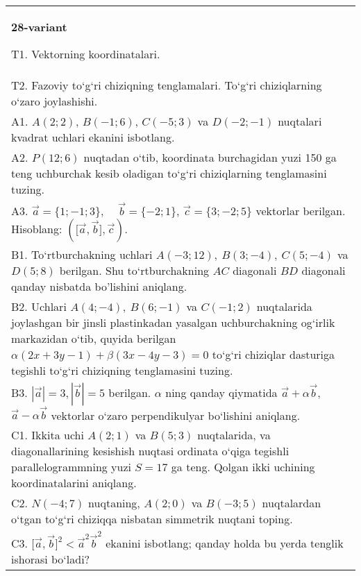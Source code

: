 \documentclass{article}
\begin{document}
\begin{tabular}{m{17cm}}
\textbf{28-variant}
\newline

T1. 
Vektorning koordinatalari.
 \\
T2. 
Fazoviy to‘g‘ri chiziqning tenglamalari. To‘g‘ri chiziqlarning o‘zaro joylashishi.
 \\
A1. 
$A (2;2) $, $B (-1;6) $, $C (-5;3) $ va $D (-2;-1) $
nuqtalari kvadrat uchlari ekanini isbotlang.
 \\
A2. 
$P (12;6)$ nuqtadan o‘tib, koordinata burchagidan
yuzi 150 ga teng uchburchak kesib oladigan to‘g‘ri chiziqlarning
tenglamasini tuzing.
 \\
A3. 
$\overrightarrow{a}
= \{ 1; - 1;3\}, \ \ \ \ \ \overrightarrow{b} = \{ - 2;1\}$, $\overrightarrow{c} = \{3; -2;5\}$ vektorlar berilgan. Hisoblang:
$ (\lbrack\overrightarrow{a},\overrightarrow{b}\rbrack,\overrightarrow{c}) $.
 \\
B1. 
To‘rtburchakning uchlari
\(A (-3;12),\ B (3;-4),\ C (5;-4) \) va \(D (5;8) \) berilgan. Shu
to‘rtburchakning $AC$ diagonali $BD$ diagonali qanday
nisbatda bo'lishini aniqlang.
 \\
B2. 
Uchlari \(A (4;-4),\ B (6;-1) \) va \(C (-1;2) \)
nuqtalarida joylashgan bir jinsli plastinkadan yasalgan uchburchakning
og‘irlik markazidan o‘tib, quyida berilgan
\(\alpha (2x+3y-1) +\beta (3x-4y-3) =0\) to‘g‘ri chiziqlar dasturiga
tegishli to‘g‘ri chiziqning tenglamasini tuzing. \\
B3. 
$|\vec{a}| = 3,|\vec{b}| = 5$ berilgan. $\alpha$ ning qanday qiymatida $\vec{a} + \alpha\vec{b}$, $\vec{a} - \alpha\vec{b}$ vektorlar o‘zaro perpendikulyar bo‘lishini aniqlang.
 \\
C1. 
Ikkita uchi \(A (2;1) \) va \(B (5; 3) \) nuqtalarida, va
diagonallarining kesishish nuqtasi ordinata o‘qiga tegishli
parallelogrammning yuzi \(S = 17\) ga teng. Qolgan ikki uchining
koordinatalarini aniqlang. \\
C2. 
\(N (- 4; 7) \) nuqtaning, \(A (2;0) \) va \(B (- 3;5) \)
nuqtalardan o‘tgan to‘g‘ri chiziqqa nisbatan simmetrik nuqtani toping.
 \\
C3. 
\(\lbrack\vec{a},\vec{b}\rbrack^{2} < {\vec{a}}^{2}{\vec{b}}^{2}\) ekanini isbotlang; qanday holda bu yerda tenglik ishorasi bo‘ladi?
 \\

\end{tabular}
\vspace{1cm}
\end{document}
